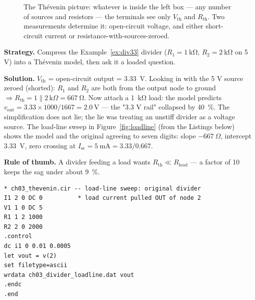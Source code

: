 \begin{figure}[htbp]
\centering

\caption{The Th\'evenin picture: whatever is inside the left box — any number
of sources and resistors — the terminals see only $V_{\mathrm{th}}$ and
$R_{\mathrm{th}}$. Two measurements determine it: open-circuit voltage, and
either short-circuit current or resistance-with-sources-zeroed.}
\label{fig:thevenin}
\end{figure}

\begin{example}
\label{ex:thevdiv}
\textbf{Strategy.} Compress the Example~\ref{ex:div33} divider
($R_1=\qty{1}{\kilo\ohm}$, $R_2=\qty{2}{\kilo\ohm}$ on 5 V) into a
Th\'evenin model, then ask it a loaded question.

\textbf{Solution.} $V_{\mathrm{th}}$ = open-circuit output = \qty{3.33}{\volt}.
Looking in with the 5 V source zeroed (shorted): $R_1$ and $R_2$ are both
from the output node to ground $\Rightarrow
R_{\mathrm{th}} = 1\|2\,\mathrm{k}\Omega = \qty{667}{\ohm}$.
Now attach a \qty{1}{\kilo\ohm} load: the model predicts
$v_{\mathrm{out}} = 3.33 \times 1000/1667 = \qty{2.0}{\volt}$ — the "3.3 V
rail" collapsed by \qty{40}{\percent}. The simplification does not lie; the
lie was treating an unstiff divider as a voltage source. The load-line
sweep in Figure~\ref{fig:loadline} (from the Listings below) shows the model
and the original agreeing to seven digits: slope $-667\ \Omega$, intercept
\qty{3.33}{\volt}, zero crossing at $I_{\mathrm{sc}}=\qty{5}{\milli\ampere}
= 3.33/0.667$.

\textbf{Rule of thumb.} A divider feeding a load wants
$R_{\mathrm{th}} \ll R_{\mathrm{load}}$ — a factor of 10 keeps the sag under
about \qty{9}{\percent}.
\end{example}

\begin{lstlisting}[language={},caption={\texttt{code/ch03\_thevenin.cir} — sweep a load current, record $v_{\mathrm{out}}$ (simulation S3). \texttt{code/ch03\_thevenin\_model.cir} is the same file with the two resistors replaced by $V_{\mathrm{th}}{=}\qty{3.333}{\volt}$ and $R_{\mathrm{th}}{=}\qty{667}{\ohm}$.},label=lst:thevcir]
* ch03_thevenin.cir -- load-line sweep: original divider
I1 2 0 DC 0          * load current pulled OUT of node 2
V1 1 0 DC 5
R1 1 2 1000
R2 2 0 2000
.control
dc i1 0 0.01 0.0005
let vout = v(2)
set filetype=ascii
wrdata ch03_divider_loadline.dat vout
.endc
.end
\end{lstlisting}

